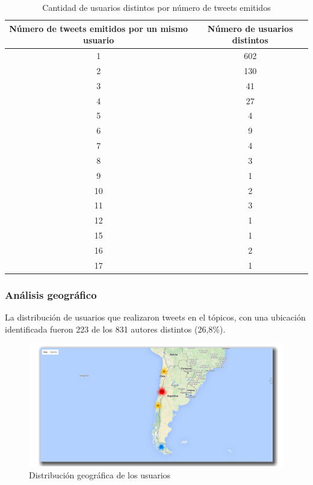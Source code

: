 \begin{table}[H]
	\centering
	\begin{tabular}{| c | c |}
		\hline
		\multicolumn{1}{|p{3cm}|}{Número de tweets emitidos por un mismo usuario} & \multicolumn{1}{p{3cm}|}{Número de usuarios  distintos} \\ \hline
		1 & 602 \\ \hline
		2 & 130 \\ \hline
		3 & 41  \\ \hline
		4 & 27 \\ \hline
		5 & 4  \\ \hline
		6 & 9  \\ \hline
		7 & 4  \\ \hline
		8 & 3  \\ \hline
		9 & 1  \\ \hline
		10 & 2  \\ \hline
		11 & 3  \\ \hline
		12 & 1  \\ \hline
		15 & 1  \\ \hline
		16 & 2  \\ \hline
		17 & 1  \\ \hline
	\end{tabular}
	\caption {Cantidad de usuarios distintos por número de tweets emitidos}
\end{table}

\subsubsection{Análisis geográfico}

La distribución de usuarios que realizaron tweets en el tópicos, con una ubicación 
identificada fueron 223 de los 831 autores distintos (26,8\%).

\begin{figure}[H]
	\centering
	\includegraphics[width=1\textwidth]{imgs/213_usuarios_mapa.png}
	\caption{Distribución geográfica de los usuarios}
	\label{fig:geo_usuarios_213}
\end{figure}

